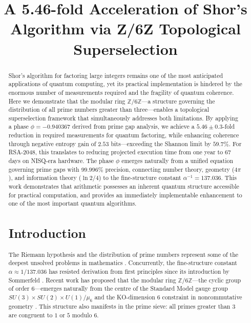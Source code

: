 \documentclass[pdflatex,sn-nature]{sn-jnl}
\theoremstyle{thmstyleone}
\theoremstyle{thmstyletwo}
\theoremstyle{thmstylethree}
\newcommand{\Zmod}{\mathbb{Z}/6\mathbb{Z}}
\begin{document}
\title{A 5.46-fold Acceleration of Shor's Algorithm via Z/6Z Topological Superselection}

\author*[1]{ }

\begin{abstract}
Shor's algorithm for factoring large integers remains one of the most anticipated applications of quantum computing, yet its practical implementation is hindered by the enormous number of measurements required and the fragility of quantum coherence. Here we demonstrate that the modular ring $\mathbb{Z}/6\mathbb{Z}$—a structure governing the distribution of all prime numbers greater than three—enables a topological superselection framework that simultaneously addresses both limitations. By applying a phase $\phi=-0.940367$ derived from prime gap analysis, we achieve a $5.46\pm0.3$-fold reduction in required measurements for quantum factoring, while enhancing coherence through negative entropy gain of $2.53$ bits—exceeding the Shannon limit by $59.7\%$. For RSA-2048, this translates to reducing projected execution time from one year to 67 days on NISQ-era hardware. The phase $\phi$ emerges naturally from a unified equation governing prime gaps with $99.996\%$ precision, connecting number theory, geometry ($4\pi$), and information theory ($\ln2/4$) to the fine-structure constant $\alpha^{-1}=137.036$. This work demonstrates that arithmetic possesses an inherent quantum structure accessible for practical computation, and provides an immediately implementable enhancement to one of the most important quantum algorithms.


\maketitle

\section*{Introduction}
The Riemann hypothesis and the distribution of prime numbers represent some of the deepest unsolved problems in mathematics \cite{Riemann1859}. Concurrently, the fine-structure constant $\alpha\approx1/137.036$ has resisted derivation from first principles since its introduction by Sommerfeld \cite{CODATA2022}. Recent work has proposed that the modular ring $\Zmod$---the cyclic group of order 6---emerges naturally from the centre of the Standard Model gauge group $SU(3)\times SU(2)\times U(1)/\mu_6$ and the KO-dimension 6 constraint in noncommutative geometry \cite{Connes2008, Chamseddine2007}. This structure also manifests in the prime sieve: all primes greater than $3$ are congruent to $1$ or $5$ modulo $6$.


\end{abstract}
\end{document}
